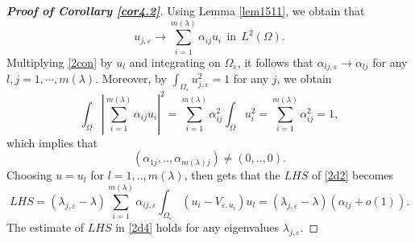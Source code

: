 \documentclass[11pt,reqno]{article}
\numberwithin{equation}{section}
\newcommand\e\varepsilon
\newcommand\la\lambda
\renewcommand\O\Omega
\begin{document}
\begin{proof}[\bf Proof of Corollary \ref{cor4.2}]
Using Lemma \ref{lem1511}, we obtain that 
\begin{equation}
    u_{j,\e}\to \sum_{i=1}^{m(\la)}\alpha_{ij} u_i \ \ \text{in}\ \ L^2(\O).
\end{equation}
  Multiplying \eqref{2con} by $u_l$  and integrating on $\O_\e$, it follows that $\alpha_{lj,\e}\to \alpha_{lj}$ for any $l,j=1,\cdots,m(\lambda)$.
		Moreover, by $\int_{\O_\e}u_{j,\e}^2=1$  for any $j$, we obtain 
        \begin{equation}
            \int_{\O}|\sum_{i=1}^{m(\la)}\alpha_{ij} u_i|^2=\sum_{i=1}^{m(\la)}\alpha_{ij}^2\int_{\O}u_i^2=\sum_{i=1}^{m(\la)}\alpha_{ij}^2=1,
        \end{equation}
        which  implies that
		\begin{equation}\label{nonz*}
			(\alpha_{1j},..,\alpha_{m(\la)j})\ne(0,..,0).
		\end{equation}
		Choosing $u=u_l$ for $l=1,..,m(\la)$, then  gets that the $LHS$ of \eqref{2d2} becomes
		\begin{equation}\label{2d4}
			LHS=(\la_{j,\e}-\la)\sum_{i=1}^{m(\la)}\alpha_{ij,\e}\int_{\O_\e}(u_i-V_{\e,u_i})u_l=(\la_{j,\e}-\la)(\alpha_{lj}+o(1)).
		\end{equation}
		The estimate of $LHS$ in \eqref{2d4} holds for any eigenvalues $\la_{j,\e}$.
        

\end{proof}
\end{document}
